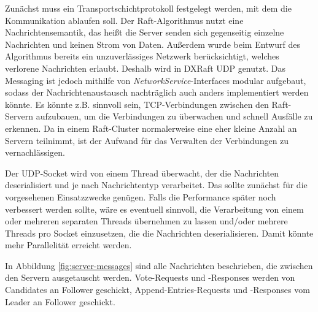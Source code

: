 Zunächst muss ein Transportschichtprotokoll festgelegt werden, mit dem die Kommunikation ablaufen soll. 
Der Raft-Algorithmus nutzt eine Nachrichtensemantik, das heißt die Server senden sich gegenseitig einzelne Nachrichten und keinen Strom von Daten. Außerdem wurde beim Entwurf des Algorithmus bereits ein unzuverlässiges Netzwerk berücksichtigt, welches verlorene Nachrichten erlaubt. Deshalb wird in DXRaft UDP genutzt. Das Messaging ist jedoch mithilfe von \textit{NetworkService}-Interfaces modular aufgebaut, sodass der Nachrichtenaustausch nachträglich auch anders implementiert werden könnte. Es könnte z.B. sinnvoll sein, TCP-Verbindungen zwischen den Raft-Servern aufzubauen, um die Verbindungen zu überwachen und schnell Ausfälle zu erkennen. Da in einem Raft-Cluster normalerweise eine eher kleine Anzahl an Servern teilnimmt, ist der Aufwand für das Verwalten der Verbindungen zu vernachlässigen.

Der UDP-Socket wird von einem Thread überwacht, der die Nachrichten deserialisiert und je nach Nachrichtentyp verarbeitet. Das sollte zunächst für die vorgesehenen Einsatzzwecke genügen. Falls die Performance später noch verbessert werden sollte, wäre es eventuell sinnvoll, die Verarbeitung von einem oder mehreren separaten Threads übernehmen zu lassen und/oder mehrere Threads pro Socket einzusetzen, die die Nachrichten deserialisieren. Damit könnte mehr Parallelität erreicht werden.

In Abbildung \ref{fig:server-messages} sind alle Nachrichten beschrieben, die zwischen den Servern ausgetauscht werden. Vote-Requests und -Responses werden von Candidates an Follower geschickt, Append-Entries-Requests und -Responses vom Leader an Follower geschickt.

